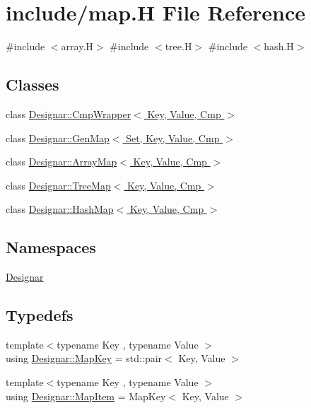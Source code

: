 \hypertarget{map_8_h}{}\section{include/map.H File Reference}
\label{map_8_h}
{\ttfamily \#include $<$array.\+H$>$}\newline
{\ttfamily \#include $<$tree.\+H$>$}\newline
{\ttfamily \#include $<$hash.\+H$>$}\newline
\subsection*{Classes}
\begin{DoxyCompactItemize}
\item 
class \hyperlink{class_designar_1_1_cmp_wrapper}{Designar\+::\+Cmp\+Wrapper$<$ Key, Value, Cmp $>$}
\item 
class \hyperlink{class_designar_1_1_gen_map}{Designar\+::\+Gen\+Map$<$ Set, Key, Value, Cmp $>$}
\item 
class \hyperlink{class_designar_1_1_array_map}{Designar\+::\+Array\+Map$<$ Key, Value, Cmp $>$}
\item 
class \hyperlink{class_designar_1_1_tree_map}{Designar\+::\+Tree\+Map$<$ Key, Value, Cmp $>$}
\item 
class \hyperlink{class_designar_1_1_hash_map}{Designar\+::\+Hash\+Map$<$ Key, Value, Cmp $>$}
\end{DoxyCompactItemize}
\subsection*{Namespaces}
\begin{DoxyCompactItemize}
\item 
 \hyperlink{namespace_designar}{Designar}
\end{DoxyCompactItemize}
\subsection*{Typedefs}
\begin{DoxyCompactItemize}
\item 
{\footnotesize template$<$typename Key , typename Value $>$ }\\using \hyperlink{namespace_designar_a7394b1b25278abf7211e77b91eb5204f}{Designar\+::\+Map\+Key} = std\+::pair$<$ Key, Value $>$
\item 
{\footnotesize template$<$typename Key , typename Value $>$ }\\using \hyperlink{namespace_designar_abc6ea5602461a15100a645d1f0e5cbcb}{Designar\+::\+Map\+Item} = Map\+Key$<$ Key, Value $>$
\end{DoxyCompactItemize}
